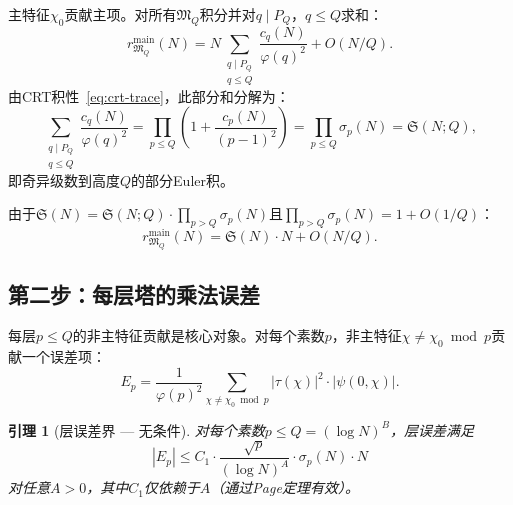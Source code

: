 \documentclass[11pt,a4paper]{article}
\newtheorem{lemma}[theorem]{引理}
\theoremstyle{remark}
\newcommand{\mM}{\mathfrak{M}}
\begin{document}
主特征$\chi_0$贡献主项。对所有$\mM_Q$积分并对$q \mid P_Q$，$q \leq Q$求和：
\begin{equation}
\label{eq:main-term-tower}
  r_{\mM_Q}^{\text{main}}(N) = N \sum_{\substack{q \mid P_Q \\ q \leq Q}}
    \frac{c_q(N)}{\varphi(q)^2} + O(N/Q).
\end{equation}
由CRT积性~\eqref{eq:crt-trace}，此部分和分解为：
\begin{equation}
\label{eq:partial-product}
  \sum_{\substack{q \mid P_Q \\ q \leq Q}} \frac{c_q(N)}{\varphi(q)^2}
    = \prod_{p \leq Q} \left(1 + \frac{c_p(N)}{(p-1)^2}\right)
    = \prod_{p \leq Q} \sigma_p(N) = \mathfrak{S}(N; Q),
\end{equation}
即奇异级数到高度$Q$的部分Euler积。

由于$\mathfrak{S}(N) = \mathfrak{S}(N;Q) \cdot \prod_{p > Q}\sigma_p(N)$且$\prod_{p > Q}\sigma_p(N) = 1 + O(1/Q)$：
\begin{equation}
\label{eq:main-term-SS}
  r_{\mM_Q}^{\text{main}}(N) = \mathfrak{S}(N) \cdot N + O(N/Q).
\end{equation}

\subsection{第二步：每层塔的乘法误差}
\label{subsec:layer-error}

每层$p \leq Q$的非主特征贡献是核心对象。对每个素数$p$，非主特征$\chi \neq \chi_0 \bmod p$贡献一个误差项：
\begin{equation}
\label{eq:layer-error}
  E_p = \frac{1}{\varphi(p)^2}\sum_{\chi \neq \chi_0 \bmod p}
    |\tau(\chi)|^2 \cdot |\psi(0,\chi)|.
\end{equation}

\begin{lemma}[层误差界 --- 无条件]
\label{lem:layer-error}
对每个素数$p \leq Q = (\log N)^B$，层误差满足
\begin{equation}
\label{eq:layer-bound}
  |E_p| \leq C_1 \cdot \frac{\sqrt{p}}{(\log N)^A} \cdot \sigma_p(N) \cdot N
\end{equation}
对任意$A > 0$，其中$C_1$仅依赖于$A$（通过Page定理有效）。
\end{lemma}
\end{document}
